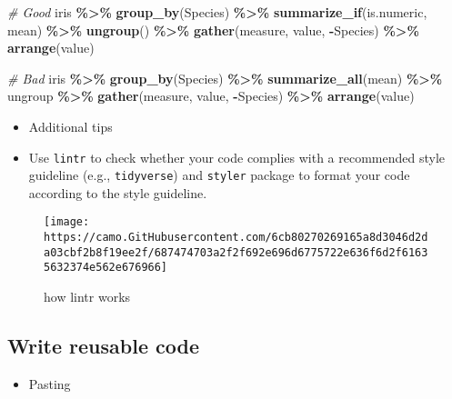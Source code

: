 \documentclass[
]{book}
\newenvironment{Shaded}{\begin{snugshade}}{\end{snugshade}}
\newcommand{\CommentTok}[1]{\textcolor[rgb]{0.56,0.35,0.01}{\textit{#1}}}
\newcommand{\KeywordTok}[1]{\textcolor[rgb]{0.13,0.29,0.53}{\textbf{#1}}}
\newcommand{\NormalTok}[1]{#1}
\newcommand{\OperatorTok}[1]{\textcolor[rgb]{0.81,0.36,0.00}{\textbf{#1}}}
\newcommand{\StringTok}[1]{\textcolor[rgb]{0.31,0.60,0.02}{#1}}
\providecommand{\tightlist}{%
  \setlength{\itemsep}{0pt}\setlength{\parskip}{0pt}}
\begin{document}
\begin{Shaded}
\begin{Highlighting}[]
\CommentTok{\# Good}
\NormalTok{iris }\OperatorTok{\%\textgreater{}\%}
\StringTok{  }\KeywordTok{group\_by}\NormalTok{(Species) }\OperatorTok{\%\textgreater{}\%}
\StringTok{  }\KeywordTok{summarize\_if}\NormalTok{(is.numeric, mean) }\OperatorTok{\%\textgreater{}\%}
\StringTok{  }\KeywordTok{ungroup}\NormalTok{() }\OperatorTok{\%\textgreater{}\%}
\StringTok{  }\KeywordTok{gather}\NormalTok{(measure, value, }\OperatorTok{{-}}\NormalTok{Species) }\OperatorTok{\%\textgreater{}\%}
\StringTok{  }\KeywordTok{arrange}\NormalTok{(value)}

\CommentTok{\# Bad}
\NormalTok{iris }\OperatorTok{\%\textgreater{}\%}\StringTok{ }\KeywordTok{group\_by}\NormalTok{(Species) }\OperatorTok{\%\textgreater{}\%}\StringTok{ }\KeywordTok{summarize\_all}\NormalTok{(mean) }\OperatorTok{\%\textgreater{}\%}
\NormalTok{ungroup }\OperatorTok{\%\textgreater{}\%}\StringTok{ }\KeywordTok{gather}\NormalTok{(measure, value, }\OperatorTok{{-}}\NormalTok{Species) }\OperatorTok{\%\textgreater{}\%}
\KeywordTok{arrange}\NormalTok{(value)}
\end{Highlighting}
\end{Shaded}

\begin{itemize}
\item
  Additional tips
\item
  Use \texttt{lintr} to check whether your code complies with a recommended style guideline (e.g., \texttt{tidyverse}) and \texttt{styler} package to format your code according to the style guideline.
\end{itemize}

\begin{figure}
\centering
\texttt{[image: https://camo.GitHubusercontent.com/6cb80270269165a8d3046d2da03cbf2b8f19ee2f/687474703a2f2f692e696d6775722e636f6d2f61635632374e562e676966]}
\caption{how lintr works}
\end{figure}

\hypertarget{write-reusable-code}{%
\subsection{Write reusable code}\label{write-reusable-code}}

\begin{itemize}
\tightlist
\item
  Pasting
\end{itemize}
\end{document}
